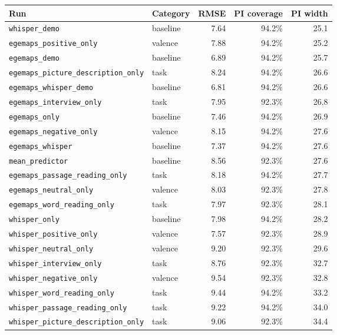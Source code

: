 \begin{tabular}{llrrr}
\toprule
Run & Category & RMSE & PI coverage & PI width \\
\midrule
\texttt{whisper\_demo} & baseline & 7.64 & 94.2\% & 25.1 \\
\texttt{egemaps\_positive\_only} & valence & 7.88 & 94.2\% & 25.2 \\
\texttt{egemaps\_demo} & baseline & 6.89 & 94.2\% & 25.7 \\
\texttt{egemaps\_picture\_description\_only} & task & 8.24 & 94.2\% & 26.6 \\
\texttt{egemaps\_whisper\_demo} & baseline & 6.81 & 94.2\% & 26.6 \\
\texttt{egemaps\_interview\_only} & task & 7.95 & 92.3\% & 26.8 \\
\texttt{egemaps\_only} & baseline & 7.46 & 94.2\% & 26.9 \\
\texttt{egemaps\_negative\_only} & valence & 8.15 & 94.2\% & 27.6 \\
\texttt{egemaps\_whisper} & baseline & 7.37 & 94.2\% & 27.6 \\
\texttt{mean\_predictor} & baseline & 8.56 & 92.3\% & 27.6 \\
\texttt{egemaps\_passage\_reading\_only} & task & 8.18 & 94.2\% & 27.7 \\
\texttt{egemaps\_neutral\_only} & valence & 8.03 & 92.3\% & 27.8 \\
\texttt{egemaps\_word\_reading\_only} & task & 7.97 & 92.3\% & 28.1 \\
\texttt{whisper\_only} & baseline & 7.98 & 94.2\% & 28.2 \\
\texttt{whisper\_positive\_only} & valence & 7.57 & 92.3\% & 28.9 \\
\texttt{whisper\_neutral\_only} & valence & 9.20 & 92.3\% & 29.6 \\
\texttt{whisper\_interview\_only} & task & 8.76 & 92.3\% & 32.7 \\
\texttt{whisper\_negative\_only} & valence & 9.54 & 92.3\% & 32.8 \\
\texttt{whisper\_word\_reading\_only} & task & 9.44 & 94.2\% & 33.2 \\
\texttt{whisper\_passage\_reading\_only} & task & 9.22 & 94.2\% & 34.0 \\
\texttt{whisper\_picture\_description\_only} & task & 9.06 & 92.3\% & 34.4 \\
\bottomrule
\end{tabular}
